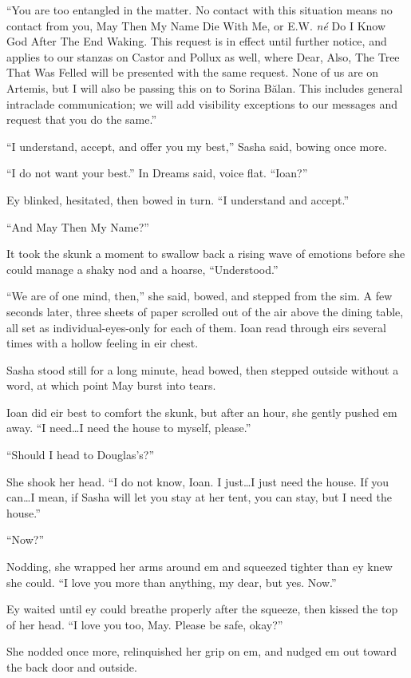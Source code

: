 ``You are too entangled in the matter. No contact with this situation means no contact from you, May Then My Name Die With Me, or E.W. \emph{né} Do I Know God After The End Waking. This request is in effect until further notice, and applies to our stanzas on Castor and Pollux as well, where Dear, Also, The Tree That Was Felled will be presented with the same request. None of us are on Artemis, but I will also be passing this on to Sorina Bălan. This includes general intraclade communication; we will add visibility exceptions to our messages and request that you do the same.''

``I understand, accept, and offer you my best,'' Sasha said, bowing once more.

``I do not want your best.'' In Dreams said, voice flat. ``Ioan?''

Ey blinked, hesitated, then bowed in turn. ``I understand and accept.''

``And May Then My Name?''

It took the skunk a moment to swallow back a rising wave of emotions before she could manage a shaky nod and a hoarse, ``Understood.''

``We are of one mind, then,'' she said, bowed, and stepped from the sim. A few seconds later, three sheets of paper scrolled out of the air above the dining table, all set as individual-eyes-only for each of them. Ioan read through eirs several times with a hollow feeling in eir chest.

Sasha stood still for a long minute, head bowed, then stepped outside without a word, at which point May burst into tears.

Ioan did eir best to comfort the skunk, but after an hour, she gently pushed em away. ``I need\ldots I need the house to myself, please.''

``Should I head to Douglas's?''

She shook her head. ``I do not know, Ioan. I just\ldots I just need the house. If you can\ldots I mean, if Sasha will let you stay at her tent, you can stay, but I need the house.''

``Now?''

Nodding, she wrapped her arms around em and squeezed tighter than ey knew she could. ``I love you more than anything, my dear, but yes. Now.''

Ey waited until ey could breathe properly after the squeeze, then kissed the top of her head. ``I love you too, May. Please be safe, okay?''

She nodded once more, relinquished her grip on em, and nudged em out toward the back door and outside.


